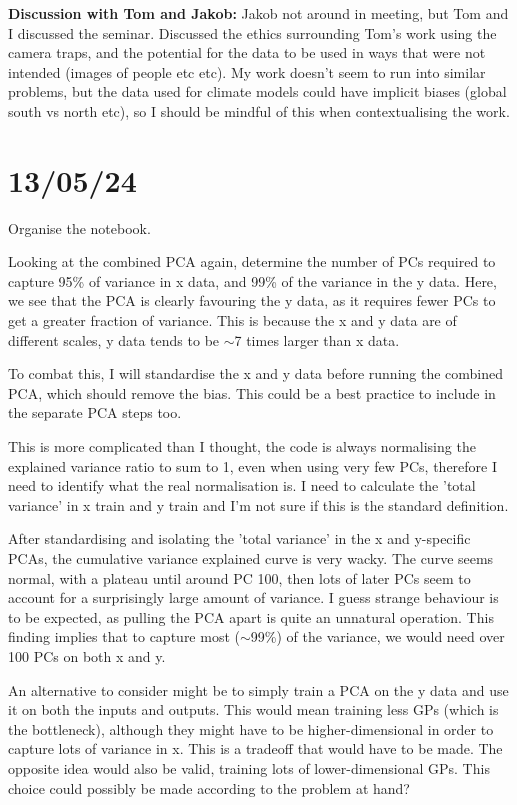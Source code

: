 \documentclass[11pt,a4paper]{article}
\begin{document}
\textbf{Discussion with Tom and Jakob:}
Jakob not around in meeting, but Tom and I discussed the seminar.
Discussed the ethics surrounding Tom's work using the camera traps, and the potential for the data to be used in ways that were not intended (images of people etc etc).
My work doesn't seem to run into similar problems, but the data used for climate models could have implicit biases (global south vs north etc), so I should be mindful of this when contextualising the work.

\section{13/05/24}

Organise the notebook.

Looking at the combined PCA again, determine the number of PCs required to capture 95\% of variance in x data, and 99\% of the variance in the y data.
Here, we see that the PCA is clearly favouring the y data, as it requires fewer PCs to get a greater fraction of variance.
This is because the x and y data are of different scales, y data tends to be $\sim$7 times larger than x data.

To combat this, I will standardise the x and y data before running the combined PCA, which should remove the bias. 
This could be a best practice to include in the separate PCA steps too.

This is more complicated than I thought, the code is always normalising the explained variance ratio  to sum to 1, even when using very few PCs, therefore I need to identify what the real normalisation is.
I need to calculate the 'total variance' in x train and y train and I'm not sure if this is the standard definition.

After standardising and isolating the 'total variance' in the x and y-specific PCAs, the cumulative variance explained curve is very wacky.
The curve seems normal, with a plateau until around PC 100, then lots of later PCs seem to account for a surprisingly large amount of variance.
I guess strange behaviour is to be expected, as pulling the PCA apart is quite an unnatural operation.
This finding implies that to capture most ($\sim$99\%) of the variance, we would need over 100 PCs on both x and y.

An alternative to consider might be to simply train a PCA on the y data and use it on both the inputs and outputs.
This would mean training less GPs (which is the bottleneck), although they might have to be higher-dimensional in order to capture lots of variance in x.
This is a tradeoff that would have to be made.
The opposite idea would also be valid, training lots of lower-dimensional GPs.
This choice could possibly be made according to the problem at hand?
\end{document}
